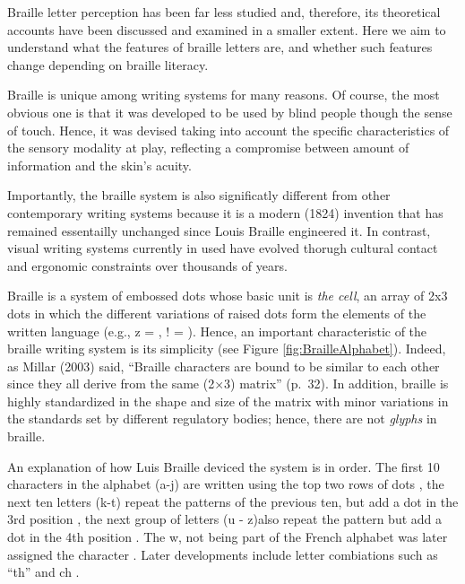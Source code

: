 \documentclass[english,man]{apa7}
\begin{document}
Braille letter perception has been far less studied and, therefore, its theoretical accounts have been discussed and examined in a smaller extent. Here we aim to understand what the features of braille letters are, and whether such features change depending on braille literacy.

{\colorbox{darkyellow}{\sffamily\scriptsize\bfseries\color{white}{pga}}}{\sffamily\small\itshape\color{darkyellow}{Explain what Braille is}} 
{\colorbox{blue}{\sffamily\scriptsize\bfseries\color{white}{abl}}}{\sffamily\small\itshape\color{blue}{\& what its known regarding letter perception}}

Braille is unique among writing systems for many reasons. Of course, the most obvious one is that it was developed to be used by blind people though the sense of touch. Hence, it was devised taking into account the specific characteristics of the sensory modality at play, reflecting a compromise between amount of information and the skin's acuity.

Importantly, the braille system is also significatly different from other contemporary writing systems because it is a modern (1824) {\colorbox{darkyellow}{\sffamily\scriptsize\bfseries\color{white}{pga}}}{\sffamily\small\itshape\color{darkyellow}{en algun sitio he visto 1829, asi que ya no se yo cual es la fecha}} invention that has remained essentailly unchanged since Louis Braille engineered it. In contrast, visual writing systems currently in used have evolved thorugh cultural contact and ergonomic constraints over thousands of years.

Braille is a system of embossed dots whose basic unit is \emph{the cell}, an array of 2x3 dots in which the different variations of raised dots form the elements of the written language (e.g., z = , ! = \braille{!}). Hence, an important characteristic of the braille writing system is its simplicity (see Figure \ref{fig:BrailleAlphabet}). Indeed, as Millar (2003) said, \enquote{Braille characters are bound to be similar to each other since they all derive from the same (2×3) matrix} (p.~32). In addition, braille is highly standardized in the shape and size of the matrix with minor variations in the standards set by different regulatory bodies; hence, there are not \emph{glyphs} in braille.

An explanation of how Luis Braille deviced the system is in order. The first 10 characters in the alphabet (a-j) are written using the top two rows of dots , the next ten letters (k-t) repeat the patterns of the previous ten, but add a dot in the 3rd position , the next group of letters (u - z)also repeat the pattern but add a dot in the 4th position . The w, not being part of the French alphabet was later assigned the character . Later developments include letter combiations such as \enquote{th}  and ch .
\end{document}
